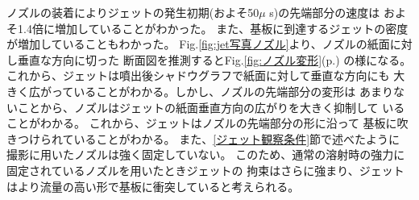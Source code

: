 ノズルの装着によりジェットの発生初期(およそ50$\mu$ s)の先端部分の速度は
およそ1.4倍に増加していることがわかった。
また、基板に到達するジェットの密度が増加していることもわかった。
Fig.\ref{fig:jet写真ノズル}より、ノズルの紙面に対し垂直な方向に切った
断面図を推測するとFig.\ref{fig:ノズル変形}(p.\pageref{fig:ノズル変形})
の様になる。
これから、ジェットは噴出後シャドウグラフで紙面に対して垂直な方向にも
大きく広がっていることがわかる。しかし、ノズルの先端部分の変形は
あまりないことから、ノズルはジェットの紙面垂直方向の広がりを大きく抑制して
いることがわかる。
これから、ジェットはノズルの先端部分の形に沿って
基板に吹きつけられていることがわかる。
また、\ref{ジェット観察条件}節で述べたように
撮影に用いたノズルは強く固定していない。
このため、通常の溶射時の強力に固定されているノズルを用いたときジェットの
拘束はさらに強まり、ジェットはより流量の高い形で基板に衝突していると考えられる。










